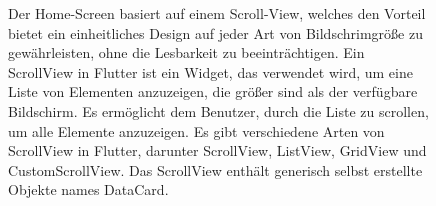 \begin{figure}[h!]
\begin{minipage}[c]{0.5\textwidth}
    \end{minipage}
    \begin{minipage}[c]{0.5\textwidth}
      \label{fig:deinbild}
      Der Home-Screen basiert auf einem Scroll-View,
      welches den Vorteil bietet ein einheitliches Design auf jeder Art von Bildschrimgröße zu gewährleisten, ohne die Lesbarkeit zu beeinträchtigen. 
      Ein ScrollView in Flutter ist ein Widget, das verwendet wird, um eine Liste von Elementen anzuzeigen, die größer sind als der verfügbare Bildschirm. 
      Es ermöglicht dem Benutzer, durch die Liste zu scrollen, um alle Elemente anzuzeigen. Es gibt verschiedene Arten von ScrollView in Flutter, darunter ScrollView, ListView, GridView und CustomScrollView. Das ScrollView enthält generisch selbst erstellte Objekte names DataCard.
    \end{minipage}
  \end{figure}
  \newpage
